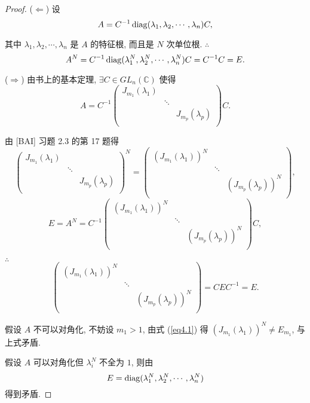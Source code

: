\documentclass[color=black,device=normal,lang=cn,mode=geye]{elegantnote}
\begin{document}
\begin{proof}
    ($\Leftarrow$) 设
    \[A=C^{-1}\operatorname{diag} (\lambda_1,\lambda_2,\cdots,\lambda_n)C,\]

    其中 $\lambda_1,\lambda_2,\cdots,\lambda_n$ 是 $A$ 的特征根, 而且是 $N$ 次单位根. $\therefore$
    \[A^N=C^{-1}\operatorname{diag}(\lambda_1^N,\lambda_2^N,\cdots,\lambda_n^N)C=C^{-1}C=E.\]

    ($\Rightarrow$) 由书上的基本定理, $\exists C\in GL _n(\mathbb{C})$ 使得
    \[A=C^{-1}\begin{pmatrix}
        J_{m_1}(\lambda_1) \\
        & \ddots \\
        && J_{m_p}(\lambda_p) \\
    \end{pmatrix}C.\]

    由 [BAI] 习题 2.3 的第 17 题得
    \[\begin{pmatrix}
        J_{m_1}(\lambda_1) \\
        & \ddots \\
        && J_{m_p}(\lambda_p) \\
    \end{pmatrix}^N=\begin{pmatrix}
        (J_{m_1}(\lambda_1))^N \\
        & \ddots \\
        && (J_{m_p}(\lambda_p))^N \\
    \end{pmatrix},\]
    \[E=A^N=C^{-1}\begin{pmatrix}
        (J_{m_1}(\lambda_1))^N \\
        & \ddots \\
        && (J_{m_p}(\lambda_p))^N \\
    \end{pmatrix}C,\]

    $\therefore$
    \[\begin{pmatrix}
        (J_{m_1}(\lambda_1))^N \\
        & \ddots \\
        && (J_{m_p}(\lambda_p))^N \\
    \end{pmatrix}=CEC^{-1}=E.\]

    假设 $A$ 不可以对角化, 不妨设 $m_1>1$, 由式 (\ref{eq4.1}) 得 $(J_{m_1}(\lambda_1))^N\neq E_{m_1}$, 与上式矛盾.

    假设 $A$ 可以对角化但 $\lambda_i^N$ 不全为 $1$, 则由
    \[E=\operatorname{diag}(\lambda_1^N,\lambda_2^N,\cdots,\lambda_n^N)\]
    得到矛盾.


\end{proof}
\end{document}
